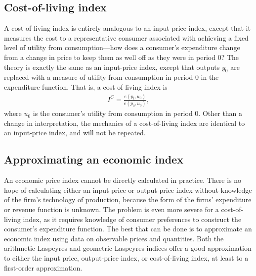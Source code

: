 \documentclass[]{article}
\begin{document}
\hypertarget{cost-of-living-index}{%
\subsection{Cost-of-living index}\label{cost-of-living-index}}

A cost-of-living index is entirely analogous to an input-price index, except that it measures the cost to a representative consumer associated with achieving a fixed level of utility from consumption---how does a consumer's expenditure change from a change in price to keep them as well off as they were in period 0? The theory is exactly the same as an input-price index, except that outputs \(y_0\) are replaced with a measure of utility from consumption in period 0 in the expenditure function. That is, a cost of living index is
\begin{align*}
I^{C} = \frac{e(p_{t}, u_{0})}{e(p_{0}, u_{0})},
\end{align*}
where \(u_{0}\) is the consumer's utility from consumption in period 0. Other than a change in interpretation, the mechanics of a cost-of-living index are identical to an input-price index, and will not be repeated.

\hypertarget{approximating-an-economic-index}{%
\subsection{Approximating an economic index}\label{approximating-an-economic-index}}

An economic price index cannot be directly calculated in practice. There is no hope of calculating either an input-price or output-price index without knowledge of the firm's technology of production, because the form of the firms' expenditure or revenue function is unknown. The problem is even more severe for a cost-of-living index, as it requires knowledge of consumer preferences to construct the consumer's expenditure function. The best that can be done is to approximate an economic index using data on observable prices and quantities. Both the arithmetic Laspeyres and geometric Laspeyres indices offer a good approximation to either the input price, output-price index, or cost-of-living index, at least to a first-order approximation.
\end{document}
